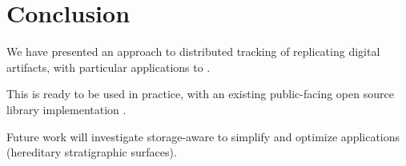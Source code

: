 \section{Conclusion} \label{sec:conclusion}

We have presented an approach to distributed tracking of replicating digital artifacts, with particular applications to .

This is ready to be used in practice, with an existing public-facing open source library implementation \citep{moreno2022hstrat}.

Future work will investigate storage-aware to simplify and optimize applications (hereditary stratigraphic surfaces).
